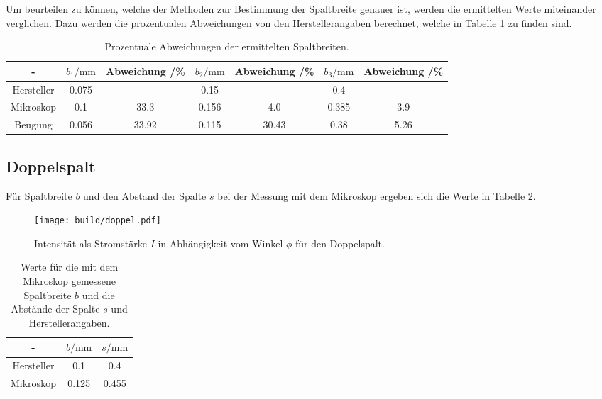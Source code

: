 Um beurteilen zu können, welche der Methoden zur Bestimmung der Spaltbreite genauer ist, werden die ermittelten Werte miteinander verglichen. Dazu werden die prozentualen Abweichungen von den Herstellerangaben berechnet, welche in Tabelle \ref{tab:abweichungen} zu finden sind.

\begin{table}
  \caption{Prozentuale Abweichungen der ermittelten Spaltbreiten.}
  \centering
  \label{tab:abweichungen}
  \begin{tabular}{c c c c c c c}
    \toprule
   - & $b_1/\si{\milli\meter}$ & Abweichung /\% & $b_2/\si{\milli\meter}$ & Abweichung /\% & $b_3/\si{\milli\meter}$ & Abweichung /\%\\
   \midrule
Hersteller & 0.075 & - & 0.15 & - & 0.4 & -  \\
Mikroskop & 0.1 & 33.3 & 0.156 & 4.0 & 0.385 & 3.9\\
Beugung & 0.056 & 33.92 & 0.115 & 30.43 &  0.38 & 5.26 \\
  \bottomrule
  \end{tabular}
  \end{table}

  \subsection{Doppelspalt}
  Für Spaltbreite $b$ und den Abstand der Spalte $s$ bei der Messung mit dem Mikroskop ergeben sich die Werte in Tabelle \ref{tab:s}.

\begin{figure}
  \centering
  \texttt{[image: build/doppel.pdf]}
  \caption{Intensität als Stromstärke $I$ in Abhängigkeit vom Winkel $\phi$ für den Doppelspalt.}
  \label{fig:doppel}
\end{figure}

  \begin{table}
    \caption{Werte für die mit dem Mikroskop gemessene Spaltbreite $b$ und die Abstände der Spalte $s$ und Herstellerangaben.}
    \centering
    \label{tab:s}
    \begin{tabular}{c c c}
      \toprule
     - & $b/\si{\milli\meter}$ & $s/\si{\milli\meter}$\\
     \midrule
     Hersteller & 0.1 & 0.4 \\
     Mikroskop & 0.125 & 0.455 \\
     \bottomrule
     \end{tabular}
  \end{table}

